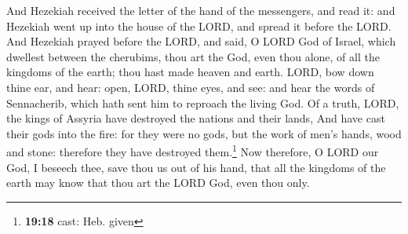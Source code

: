  And Hezekiah received the letter of the hand of the
messengers, and read it: and Hezekiah went up into the house of the
LORD, and spread it before the LORD.  And Hezekiah prayed
before the LORD, and said, O LORD God of Israel, which dwellest between
the cherubims, thou art the God, even thou alone, of all the kingdoms of
the earth; thou hast made heaven and earth.  LORD, bow
down thine ear, and hear: open, LORD, thine eyes, and see: and hear the
words of Sennacherib, which hath sent him to reproach the living God.
 Of a truth, LORD, the kings of Assyria have destroyed
the nations and their lands,  And have cast their gods
into the fire: for they were no gods, but the work of men's hands, wood
and stone: therefore they have destroyed them.\footnote{\textbf{19:18}
  cast: Heb. given}  Now therefore, O LORD our God, I
beseech thee, save thou us out of his hand, that all the kingdoms of the
earth may know that thou art the LORD God, even thou only.

